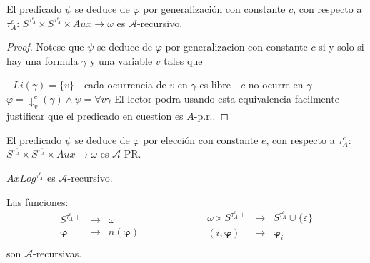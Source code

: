   \begin{lemma} \label{lemma_104}
    \PN El predicado \CL$\psi$ se deduce de $\varphi$ por generalización con constante $c$, con respecto a
    $\tau^{e}_{A}$\CR: $S^{\tau_{A}^{e}} \times S^{\tau_{A}^{e}} \times Aux \rightarrow \omega$ es $\mathcal{A}$-recursivo.
  \end{lemma}
  \begin{proof}
    Notese que $\psi $ se deduce de $\varphi $ por generalizacion con constante $ c$ si y solo si hay una formula $\gamma $ y una variable $v$ tales que

    - $Li(\gamma )=\{v\}$
    - cada ocurrencia de $v$ en $\gamma $ es libre
    - $c$ no ocurre en $\gamma $
    - $\varphi =\mathrm{\downarrow }_{v}^{c}(\gamma )\wedge \psi =\forall v\gamma $
    El lector podra usando esta equivalencia facilmente justificar que el predicado en cuestion es $A$-p.r..
  \end{proof}

  \begin{lemma} \label{lemma_105}
    \PN El predicado \CL$\psi$ se deduce de $\varphi$ por elección con constante $e$, con respecto a $\tau^{e}_{A}$\CR:
    $S^{\tau_{A}^{e}} \times S^{\tau_{A}^{e}} \times Aux \rightarrow \omega$ es $\mathcal{A}$-PR.
  \end{lemma}

  \begin{lemma} \label{lemma_106}
    \PN $AxLog^{\tau_{A}^{e}}$ es $\mathcal{A}$-recursivo.
  \end{lemma}

  \begin{lemma} \label{lemma_107}
    \PN Las funciones:
    \begin{equation*}
      \begin{aligned}
        S^{\tau_{A}^{e}+} &\rightarrow& \omega \\
        \mathbf{\varphi} &\rightarrow& n(\mathbf{\varphi}) \\
      \end{aligned}
      \qquad\qquad\qquad
      \begin{aligned}
        \omega \times S^{\tau_{A}^{e}+} &\rightarrow& S^{\tau_{A}^{e}} \cup \{\varepsilon\} \\
        (i, \mathbf{\varphi}) &\rightarrow& \mathbf{\varphi}_{i} \\
      \end{aligned}
    \end{equation*}
    \PN son $\mathcal{A}$-recursivas.
  \end{lemma}

